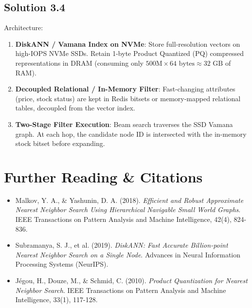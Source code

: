 \subsection*{Solution 3.4}
Architecture:
\begin{enumerate}
  \item \textbf{DiskANN / Vamana Index on NVMe}: Store full-resolution vectors on high-IOPS NVMe SSDs. Retain 1-byte Product Quantized (PQ) compressed representations in DRAM (consuming only $500\text{M} \times 64 \text{ bytes} \approx 32 \text{ GB}$ of RAM).
  \item \textbf{Decoupled Relational / In-Memory Filter}: Fast-changing attributes (price, stock status) are kept in Redis bitsets or memory-mapped relational tables, decoupled from the vector index.
  \item \textbf{Two-Stage Filter Execution}: Beam search traverses the SSD Vamana graph. At each hop, the candidate node ID is intersected with the in-memory stock bitset before expanding.
\end{enumerate}

\section{Further Reading \& Citations}
\begin{itemize}[leftmargin=18pt]
  \item Malkov, Y. A., \& Yashunin, D. A. (2018). \emph{Efficient and Robust Approximate Nearest Neighbor Search Using Hierarchical Navigable Small World Graphs}. IEEE Transactions on Pattern Analysis and Machine Intelligence, 42(4), 824-836.
  \item Subramanya, S. J., et al. (2019). \emph{DiskANN: Fast Accurate Billion-point Nearest Neighbor Search on a Single Node}. Advances in Neural Information Processing Systems (NeurIPS).
  \item Jégou, H., Douze, M., \& Schmid, C. (2010). \emph{Product Quantization for Nearest Neighbor Search}. IEEE Transactions on Pattern Analysis and Machine Intelligence, 33(1), 117-128.
\end{itemize}
